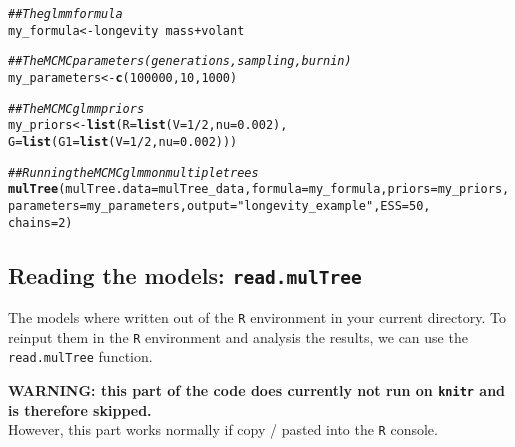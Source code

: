 \documentclass{article}\usepackage[]{graphicx}\usepackage[]{color}
\makeatletter
\newcommand{\hlnum}[1]{\textcolor[rgb]{0.686,0.059,0.569}{#1}}%
\newcommand{\hlstr}[1]{\textcolor[rgb]{0.192,0.494,0.8}{#1}}%
\newcommand{\hlcom}[1]{\textcolor[rgb]{0.678,0.584,0.686}{\textit{#1}}}%
\newcommand{\hlopt}[1]{\textcolor[rgb]{0,0,0}{#1}}%
\newcommand{\hlstd}[1]{\textcolor[rgb]{0.345,0.345,0.345}{#1}}%
\newcommand{\hlkwb}[1]{\textcolor[rgb]{0.69,0.353,0.396}{#1}}%
\newcommand{\hlkwc}[1]{\textcolor[rgb]{0.333,0.667,0.333}{#1}}%
\newcommand{\hlkwd}[1]{\textcolor[rgb]{0.737,0.353,0.396}{\textbf{#1}}}%
\newenvironment{kframe}{%
 \def\at@end@of@kframe{}%
 \ifinner\ifhmode%
  \def\at@end@of@kframe{\end{minipage}}%
  \begin{minipage}{\columnwidth}%
 \fi\fi%
 \def\FrameCommand##1{\hskip\@totalleftmargin \hskip-\fboxsep
 \colorbox{shadecolor}{##1}\hskip-\fboxsep
     \hskip-\linewidth \hskip-\@totalleftmargin \hskip\columnwidth}%
 \MakeFramed {\advance\hsize-\width
   \@totalleftmargin\z@ \linewidth\hsize
   \@setminipage}}%
 {\par\unskip\endMakeFramed%
 \at@end@of@kframe}
\newenvironment{knitrout}{}{} %
\makeatother
\begin{document}
\begin{knitrout}
\color{fgcolor}\begin{kframe}
\begin{alltt}
\hlcom{## The glmm formula}
\hlstd{my_formula} \hlkwb{<-} \hlstd{longevity} \hlopt{~} \hlstd{mass} \hlopt{+} \hlstd{volant}

\hlcom{## The MCMC parameters (generations, sampling, burnin)}
\hlstd{my_parameters} \hlkwb{<-} \hlkwd{c}\hlstd{(}\hlnum{100000}\hlstd{,} \hlnum{10}\hlstd{,} \hlnum{1000}\hlstd{)}

\hlcom{## The MCMCglmm priors}
\hlstd{my_priors} \hlkwb{<-} \hlkwd{list}\hlstd{(}\hlkwc{R} \hlstd{=} \hlkwd{list}\hlstd{(}\hlkwc{V} \hlstd{=} \hlnum{1}\hlopt{/}\hlnum{2}\hlstd{,} \hlkwc{nu} \hlstd{=} \hlnum{0.002}\hlstd{),}
    \hlkwc{G} \hlstd{=} \hlkwd{list}\hlstd{(}\hlkwc{G1} \hlstd{=} \hlkwd{list}\hlstd{(}\hlkwc{V} \hlstd{=} \hlnum{1}\hlopt{/}\hlnum{2}\hlstd{,} \hlkwc{nu} \hlstd{=} \hlnum{0.002}\hlstd{)))}

\hlcom{## Running the MCMCglmm on multiple trees}
\hlkwd{mulTree}\hlstd{(}\hlkwc{mulTree.data} \hlstd{= mulTree_data,} \hlkwc{formula} \hlstd{= my_formula,} \hlkwc{priors} \hlstd{= my_priors,}
     \hlkwc{parameters} \hlstd{= my_parameters,} \hlkwc{output} \hlstd{=} \hlstr{"longevity_example"}\hlstd{,} \hlkwc{ESS} \hlstd{=} \hlnum{50}\hlstd{,}
     \hlkwc{chains} \hlstd{=} \hlnum{2}\hlstd{)}
\end{alltt}
\end{kframe}
\end{knitrout}


\subsection{Reading the models: \texttt{read.mulTree}}
The models where written out of the \texttt{R} environment in your current directory.
To reinput them in the \texttt{R} environment and analysis the results, we can use the \texttt{read.mulTree} function.

\textbf{WARNING: this part of the code does currently not run on \texttt{knitr} and is therefore skipped.}\\
However, this part works normally if copy / pasted into the \texttt{R} console.
\end{document}
